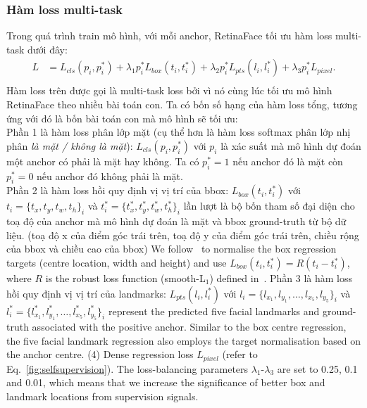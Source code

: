{    \subsubsection{Hàm loss multi-task}
    Trong quá trình train mô hình, với mỗi anchor, RetinaFace tối ưu hàm loss multi-task dưới đây:
    \begin{equation}
        \begin{split}
        L  & =  L_{cls}(p_i, p^{*}_i) + \lambda_1 p^{*}_i L_{box}(t_i, t^{*}_i) + \lambda_2 p^{*}_i L_{pts} (l_i, l^{*}_i) + \lambda_3 p^{*}_i L_{pixel}.\\
        \end{split}
        \label{eq:loss}
    \end{equation}
    Hàm loss trên được gọi là multi-task loss bởi vì nó cùng lúc tối ưu mô hình RetinaFace theo nhiều bài toán con.
    Ta có bốn số hạng của hàm loss tổng, tương ứng với đó là bốn bài toán con mà mô hình sẽ tối ưu: \\
    Phần 1 là hàm loss phân lớp mặt (cụ thể hơn là hàm loss softmax phân lớp nhị phân \textit{là mặt / không là mặt}):
    $L_{cls}(p_i, p^{*}_i)$ với $p_i$ là xác suất mà mô hình dự đoán một anchor có phải là mặt hay không.
    Ta có $p^{*}_i = 1$ nếu anchor đó là mặt còn $p^{*}_i = 0$ nếu anchor đó không phải là mặt. \\
    Phần 2 là hàm loss hồi quy định vị vị trí của bbox:
    $L_{box}(t_i, t^{*}_i)$ với $t_i=\{t_x, t_y, t_w, t_h\}_i$ và $t^{*}_i=\{t^{*}_x, t^{*}_y, t^{*}_w, t^{*}_h\}_i$ lần lượt là bộ bốn tham số đại diện cho toạ độ của anchor mà mô hình dự đoán là mặt và bbox ground-truth từ bộ dữ liệu.
    (toạ độ x của điểm góc trái trên, toạ độ y của điểm góc trái trên, chiều rộng của bbox và chiều cao của bbox)
    We follow~\cite{girshick2015fast} to normalise the box regression targets (centre location, width and height) and use $L_{box}(t_i, t^{*}_i)=R(t_i - t^{*}_i)$, where $R$ is the robust loss function (smooth-L$_1$) defined in~\cite{girshick2015fast}. 
    Phần 3 là hàm loss hồi quy định vị vị trí của landmarks:
    $L_{pts} (l_i, l^{*}_i)$ với $l_i=\{l_{x_1}, l_{y_1}, \dots , l_{x_5}, l_{y_5}\}_i$ và $l^{*}_i=\{l^{*}_{x_1}, l^{*}_{y_1}, \dots , l^{*}_{x_5}, l^{*}_{y_5}\}_i$ represent the predicted five facial landmarks and ground-truth associated with the positive anchor. 
    Similar to the box centre regression, the five facial landmark regression also employs the target normalisation based on the anchor centre.
    (4) Dense regression loss $L_{pixel}$ (refer to Eq.~\ref{fig:selfsupervision}).  
    The loss-balancing parameters $\lambda_1$-$\lambda_3$ are set to 0.25, 0.1 and 0.01, which means that we increase the significance of better box and landmark locations from supervision signals.

}
